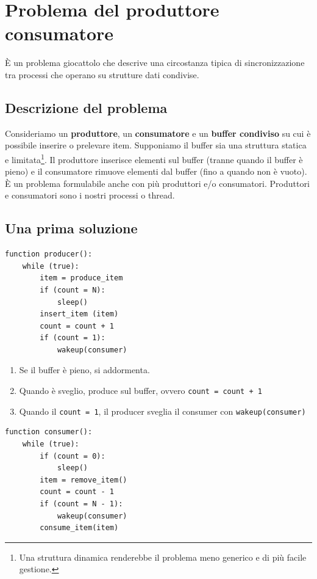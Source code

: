 \documentclass{report}
\begin{document}
\newpage

\section{Problema del produttore consumatore}
È un problema giocattolo che descrive una circostanza tipica di sincronizzazione tra processi che operano su strutture dati condivise.

\subsection{Descrizione del problema}
Consideriamo un \textbf{produttore}, un \textbf{consumatore} e un \textbf{buffer condiviso} su cui è possibile inserire o prelevare item. Supponiamo il buffer sia una struttura statica e limitata\footnote{Una struttura dinamica renderebbe il problema meno generico e di più facile gestione.}. Il produttore inserisce elementi sul buffer (tranne quando il buffer è pieno) e il consumatore rimuove elementi dal buffer (fino a quando non è vuoto). È un problema formulabile anche con più produttori e/o consumatori. Produttori e consumatori sono i nostri processi o thread.

\subsection{Una prima soluzione}

\begin{verbatim}
function producer():
    while (true):
        item = produce_item
        if (count = N): 
            sleep()
        insert_item (item)
        count = count + 1
        if (count = 1):
            wakeup(consumer)
\end{verbatim}


\begin{enumerate}
    \item Se il buffer è pieno, si addormenta.
    \item Quando è sveglio, produce sul buffer, ovvero \verb|count = count + 1|
    \item Quando il \verb|count = 1|, il producer sveglia il consumer con \verb|wakeup(consumer)|
\end{enumerate}

\begin{verbatim}
function consumer():
    while (true):
        if (count = 0): 
            sleep()
        item = remove_item()
        count = count - 1
        if (count = N - 1):
            wakeup(consumer)
        consume_item(item)
\end{verbatim}
\end{document}
